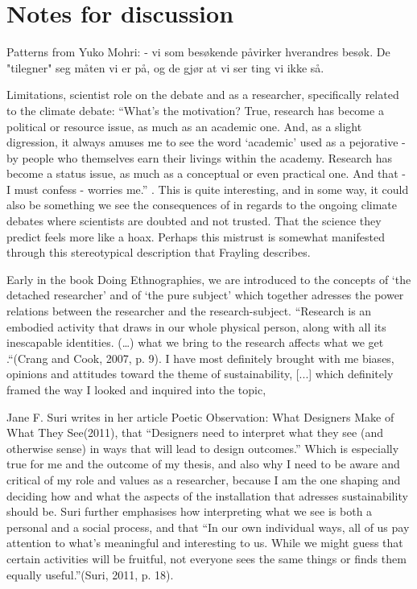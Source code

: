 \section{Notes for discussion}

Patterns from Yuko Mohri:
- vi som besøkende påvirker hverandres besøk. De "tilegner" seg måten vi er på, og de gjør at vi ser ting vi ikke så.



\par
Limitations, scientist role on the debate and as a researcher, specifically related to the climate debate:
“What’s the motivation? True, research has become a political or resource issue, as much as an academic one. And, as a slight digression, it always amuses me to see the word ‘academic’ used as a pejorative - by people who themselves earn their livings within the academy. Research has become a status issue, as much as a conceptual or even practical one. And that - I must confess - worries me.” \autocite[p. 5]{frayling_1994}. This is quite interesting, and in some way, it could also be something we see the consequences of in regards to the ongoing climate debates where scientists are doubted and not trusted. That the science they predict feels more like a hoax. Perhaps this mistrust is somewhat manifested through this stereotypical description that Frayling describes.
\par

\par
Early in the book Doing Ethnographies, we are introduced to the concepts of ‘the detached researcher’ and of ‘the pure subject’ which together adresses the power relations between the researcher and the research-subject. “Research is an embodied activity that draws in our whole physical person, along with all its inescapable identities. (…) what we bring to the research affects what we get .“(Crang and Cook, 2007, p. 9). I have most definitely brought with me biases, opinions and attitudes toward the theme of sustainability, [...] which definitely framed the way I looked and inquired into the topic,

Jane F. Suri writes in her article Poetic Observation: What Designers Make of What They See(2011), that “Designers need to interpret what they see (and otherwise sense) in ways that will lead to design outcomes.” Which is especially true for me and the outcome of my thesis, and also why I need to be aware and critical of my role and values as a researcher, because  I am the one shaping and deciding how and what the aspects of the installation that adresses sustainability should be. Suri further emphasises how interpreting what we see is both a personal and a social process, and that “In our own individual ways, all of us pay attention to what’s meaningful and interesting to us. While we might guess that certain activities will be fruitful, not everyone sees the same things or finds them equally useful.”(Suri, 2011, p. 18).

